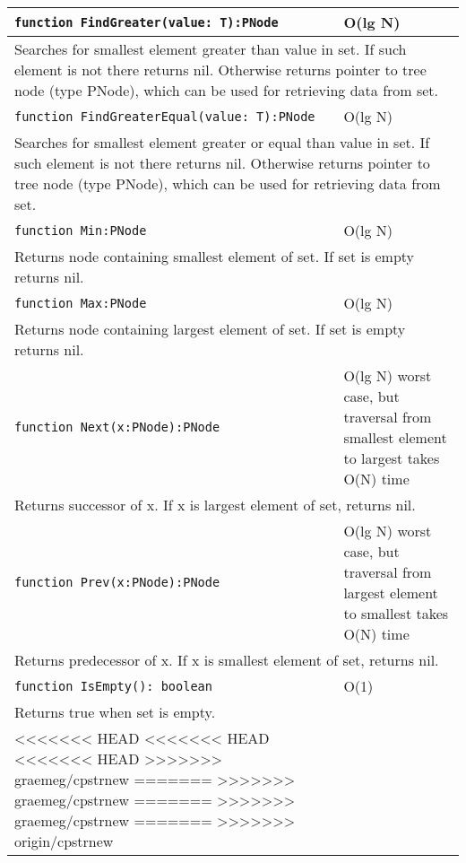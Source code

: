 \begin{longtable}{|m{10cm}|m{5cm}|}
\verb!function FindGreater(value: T):PNode! & O(lg N) \\\hline
\multicolumn{2}{|m{15cm}|}{Searches for smallest element greater than value in set. If such element is not there returns nil. Otherwise
returns pointer to tree node (type PNode), which can be used for retrieving data from set.} \\\hline\hline

\verb!function FindGreaterEqual(value: T):PNode! & O(lg N) \\\hline
\multicolumn{2}{|m{15cm}|}{Searches for smallest element greater or equal than value in set. If such element is not there returns nil. Otherwise
returns pointer to tree node (type PNode), which can be used for retrieving data from set.} \\\hline\hline

\verb!function Min:PNode! & O(lg N) \\\hline
\multicolumn{2}{|m{15cm}|}{Returns node containing smallest element of set. If set is empty returns
nil.} \\\hline\hline

\verb!function Max:PNode! & O(lg N) \\\hline
\multicolumn{2}{|m{15cm}|}{Returns node containing largest element of set. If set is empty returns
nil.} \\\hline\hline

\verb!function Next(x:PNode):PNode! & O(lg N) worst case, but traversal from smallest element to
largest takes O(N) time \\\hline
\multicolumn{2}{|m{15cm}|}{Returns successor of x. If x is largest element of set, returns nil.} \\\hline\hline

\verb!function Prev(x:PNode):PNode! & O(lg N) worst case, but traversal from largest element to
smallest takes O(N) time \\\hline
\multicolumn{2}{|m{15cm}|}{Returns predecessor of x. If x is smallest element of set, returns nil.} \\\hline\hline

\verb!function IsEmpty(): boolean! & O(1) \\ \hline
\multicolumn{2}{|m{15cm}|}{Returns true when set is empty.} \\\hline
<<<<<<< HEAD
<<<<<<< HEAD
<<<<<<< HEAD
>>>>>>> graemeg/cpstrnew
=======
>>>>>>> graemeg/cpstrnew
=======
>>>>>>> graemeg/cpstrnew
=======
>>>>>>> origin/cpstrnew

\end{longtable}
